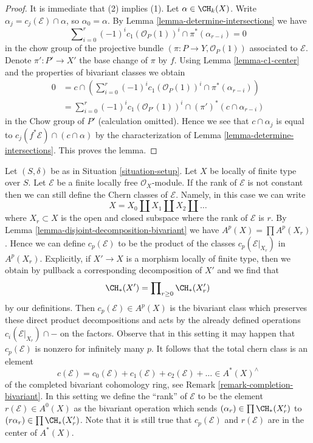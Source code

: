 \begin{proof}
It is immediate that (2) implies (1).
Let $\alpha \in \CH_k(X)$. Write $\alpha_j = c_j(\mathcal{E}) \cap \alpha$, so
$\alpha_0 = \alpha$. By Lemma \ref{lemma-determine-intersections} we have
$$
\sum\nolimits_{i = 0}^r
(-1)^i c_1(\mathcal{O}_P(1))^i \cap
\pi^*(\alpha_{r - i}) = 0
$$
in the chow group of the projective bundle
$(\pi : P \to Y, \mathcal{O}_P(1))$
associated to $\mathcal{E}$. Denote $\pi' : P' \to X'$ the base change
of $\pi$ by $f$. Using Lemma \ref{lemma-c1-center} and
the properties of bivariant classes we obtain
\begin{align*}
0 & = c \cap \left(\sum\nolimits_{i = 0}^r
(-1)^i c_1(\mathcal{O}_P(1))^i \cap
\pi^*(\alpha_{r - i})\right) \\
& =
\sum\nolimits_{i = 0}^r
(-1)^i c_1(\mathcal{O}_{P'}(1))^i \cap
(\pi')^*(c \cap \alpha_{r - i})
\end{align*}
in the Chow group of $P'$ (calculation omitted).
Hence we see that $c \cap \alpha_j$ is
equal to $c_j(f^*\mathcal{E}) \cap (c \cap \alpha)$ by the characterization
of Lemma \ref{lemma-determine-intersections}.
This proves the lemma.
\end{proof}

\begin{remark}
\label{remark-extend-to-finite-locally-free}
Let $(S, \delta)$ be as in Situation \ref{situation-setup}.
Let $X$ be locally of finite type over $S$.
Let $\mathcal{E}$ be a finite locally free $\mathcal{O}_X$-module.
If the rank of $\mathcal{E}$ is not constant then we can
still define the Chern classes of $\mathcal{E}$. Namely, in this
case we can write
$$
X = X_0 \amalg X_1 \amalg X_2 \amalg \ldots
$$
where $X_r \subset X$ is the open and closed subspace where
the rank of $\mathcal{E}$ is $r$. By 
Lemma \ref{lemma-disjoint-decomposition-bivariant}
we have $A^p(X) = \prod A^p(X_r)$.
Hence we can define $c_p(\mathcal{E})$ to be the
product of the classes $c_p(\mathcal{E}|_{X_r})$ in $A^p(X_r)$.
Explicitly, if $X' \to X$ is a morphism locally of finite type,
then we obtain by pullback a corresponding decomposition of $X'$
and we find that
$$
\CH_*(X') = \prod\nolimits_{r \geq 0} \CH_*(X'_r)
$$
by our definitions. Then $c_p(\mathcal{E}) \in A^p(X)$
is the bivariant class which preserves these direct
product decompositions and acts by the already defined
operations $c_i(\mathcal{E}|_{X_r}) \cap -$
on the factors. Observe that in this setting it may happen
that $c_p(\mathcal{E})$ is nonzero for infinitely many $p$.
It follows that the total chern class is an element
$$
c(\mathcal{E}) =
c_0(\mathcal{E}) + c_1(\mathcal{E}) + c_2(\mathcal{E}) + \ldots
\in A^*(X)^\wedge
$$
of the completed bivariant cohomology ring, see
Remark \ref{remark-completion-bivariant}.
In this setting we define the ``rank'' of $\mathcal{E}$
to be the element $r(\mathcal{E}) \in A^0(X)$
as the bivariant operation which sends $(\alpha_r) \in \prod \CH_*(X'_r)$
to $(r\alpha_r) \in \prod \CH_*(X'_r)$.
Note that it is still true that $c_p(\mathcal{E})$ and $r(\mathcal{E})$
are in the center of $A^*(X)$.
\end{remark}

